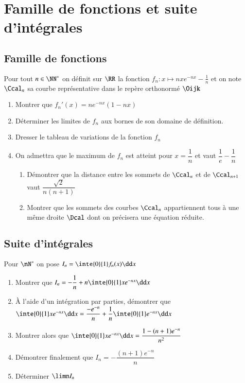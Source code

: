 \documentclass[oneside,12pt]{article}
\let\oldsection\section
\renewcommand{\section}{\newpage\oldsection}
\begin{document}
\section{Famille de fonctions et suite d'intégrales}
\subsection{Famille de fonctions}
Pour tout $n\in\NN^*$ on définit sur $\RR$ la fonction $f_n:x\mapsto nxe^{-nx}-\frac{1}{n}$ et on note $\Ccal_n$ sa courbe représentative dans le repère orthonormé $\Oijk$
\begin{enumerate}
    \item Montrer que $f_n'(x)=ne^{-nx}(1-nx)$
    \item Déterminer les limites de $f_n$ aux bornes de son domaine de définition.
    \item Dresser le tableau de variations de la fonction $f_n$
    \item On admettra que le maximum de $f_n$ est atteint pour $x=\dfrac{1}{n}$ et vaut $\dfrac{1}{e}-\dfrac{1}{n}$
    \begin{enumerate}
        \item Démontrer que la distance entre les sommets de $\Ccal_n$ et de $\Ccal_{n+1}$ vaut $\dfrac{\sqrt{2}}{n(n+1)}$
        \item Montrer que les sommets des courbes $\Ccal_n$ appartiennent tous à une même droite $\Dcal$ dont on précisera une équation réduite.
    \end{enumerate}
    
\end{enumerate}

\subsection{Suite d'intégrales}
Pour $\nN^*$ on pose $I_n=\inte{0}{1}f_n(x)\dd x$
\begin{enumerate}
    \item Montrer que $I_n=-\dfrac{1}{n}+n\inte{0}{1}xe^{-nx}\dd x$
    \item À l'aide d'un intégration par parties, démontrer que $\inte{0}{1}xe^{-nx}\dd x=\dfrac{-e^{-n}}{n}+\dfrac{1}{n}\inte{0}{1}e^{-nx}\dd x$
    \item Montrer alors que $\inte{0}{1}xe^{-nx}\dd x=\dfrac{1-(n+1)e^{-n}}{n^2}$
    \item Démontrer finalement que $I_n=-\dfrac{(n+1)e^{-n}}{n}$
    \item Déterminer $\limn I_n$
\end{enumerate}
\end{document}
